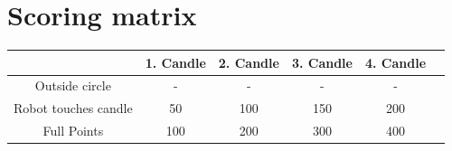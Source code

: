\documentclass[a4paper,12pt]{article}
\begin{document}
\section{Scoring matrix}
\begin{center}
\begin{tabular}{|c|c|c|c|c|c|} \hline
	 & 1. Candle & 2. Candle & 3. Candle & 4. Candle  \\ \hline
	 Outside circle & - & - & - & - \\ \hline
	Robot touches candle & 50 & 100 & 150 & 200 \\ \hline
Full Points & 100 & 200 & 300 & 400  \\ \hline
\end{tabular}
\end{center}
\end{document}
